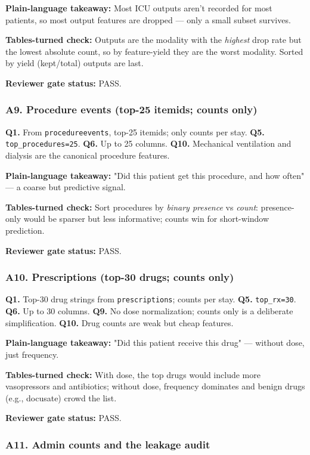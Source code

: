 \documentclass{article}
\begin{document}
\textbf{Plain-language takeaway:} Most ICU outputs aren't recorded for most patients, so most output features are dropped --- only a small subset survives.


\textbf{Tables-turned check:} Outputs are the modality with the \emph{highest} drop rate but the lowest absolute count, so by feature-yield they are the worst modality. Sorted by yield (kept/total) outputs are last.


\textbf{Reviewer gate status:} PASS.


\subsubsection{A9. Procedure events (top-25 itemids; counts only)}


\textbf{Q1.} From \texttt{procedureevents}, top-25 itemids; only counts per stay. \textbf{Q5.} \texttt{top\_procedures=25}. \textbf{Q6.} Up to 25 columns. \textbf{Q10.} Mechanical ventilation and dialysis are the canonical procedure features.


\textbf{Plain-language takeaway:} "Did this patient get this procedure, and how often" --- a coarse but predictive signal.


\textbf{Tables-turned check:} Sort procedures by \emph{binary presence} vs \emph{count}: presence-only would be sparser but less informative; counts win for short-window prediction.


\textbf{Reviewer gate status:} PASS.


\subsubsection{A10. Prescriptions (top-30 drugs; counts only)}


\textbf{Q1.} Top-30 drug strings from \texttt{prescriptions}; counts per stay. \textbf{Q5.} \texttt{top\_rx=30}. \textbf{Q6.} Up to 30 columns. \textbf{Q9.} No dose normalization; counts only is a deliberate simplification. \textbf{Q10.} Drug counts are weak but cheap features.


\textbf{Plain-language takeaway:} "Did this patient receive this drug" --- without dose, just frequency.


\textbf{Tables-turned check:} With dose, the top drugs would include more vasopressors and antibiotics; without dose, frequency dominates and benign drugs (e.g., docusate) crowd the list.


\textbf{Reviewer gate status:} PASS.


\subsubsection{A11. Admin counts and the leakage audit}
\end{document}
